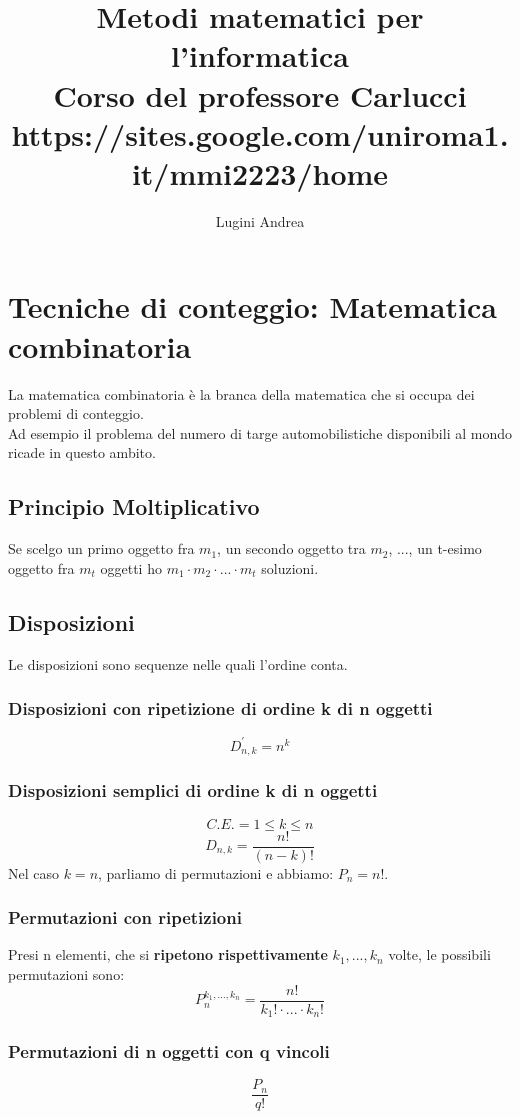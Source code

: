 \documentclass{report}
\title{%
    Metodi matematici per l'informatica \\    
    \large Corso del professore Carlucci
    \large https://sites.google.com/uniroma1.it/mmi2223/home
}
\author{Lugini Andrea}
\begin{document}
\maketitle
\tableofcontents
\newpage 
\section{Tecniche di conteggio: Matematica combinatoria}
    La matematica combinatoria è la branca della matematica che si occupa dei problemi
    di conteggio. \\
    Ad esempio il problema del numero di targe automobilistiche disponibili al mondo
    ricade in questo ambito. \\
    \subsection{Principio Moltiplicativo}
        Se scelgo un primo oggetto fra $m_1$, un secondo oggetto tra $m_2$, ..., un 
        t-esimo oggetto fra $m_t$ oggetti ho $m_1 \cdot m_2 \cdot ... \cdot m_t$ soluzioni.
    \subsection{Disposizioni}
    Le disposizioni sono sequenze nelle quali l'ordine conta.
        \subsubsection{Disposizioni con ripetizione di ordine k di n oggetti}
            $$D_{n,k}^{'} = n^k$$
        \subsubsection{Disposizioni semplici di ordine k di n oggetti}
            $$C.E. = 1 \leq k \leq n$$
            $$D_{n,k} = \frac{n!}{(n - k)!}$$
            Nel caso $k = n$, parliamo di permutazioni e abbiamo: $P_{n} = n!$.
        \subsubsection{Permutazioni con ripetizioni}
            Presi n elementi, che si \textbf{ripetono rispettivamente} $k_1, ..., k_n$ volte, le
            possibili permutazioni sono: 
            $$P_{n}^{k_1, ..., k_n} = \frac{n!}{k_1! \cdot ... \cdot k_n!}$$
        \subsubsection{Permutazioni di n oggetti con q vincoli}
            $$\frac{P_{n}}{q!}$$
\end{document}
